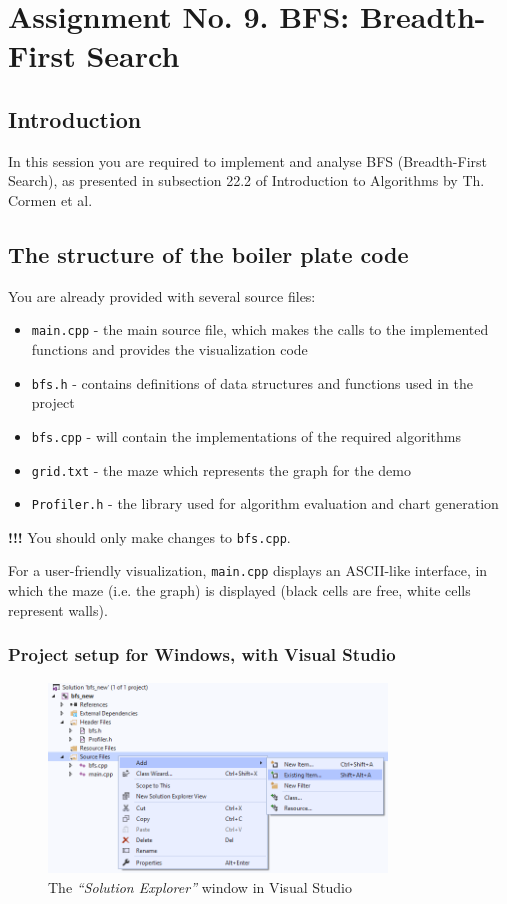 \documentclass[../en-fa-lab.tex]{subfiles}
\begin{document}
\section{\texorpdfstring{\textbf{Assignment No. 9. BFS: Breadth-First Search}}{Assignment No. 9. BFS: Breadth-First Search}}\label{assign9}




\subsection{Introduction}
In this session you are required to implement and analyse BFS (Breadth-First Search), as presented in subsection 22.2 of Introduction to Algorithms by Th. Cormen et al.

\subsection{The structure of the boiler plate code}
You are already provided with several source files:
\begin{itemize}
    \item \texttt{main.cpp} - the main source file, which makes the calls to the implemented functions and provides the visualization code
    \item \texttt{bfs.h} - contains definitions of data structures and functions used in the project
    \item \texttt{bfs.cpp} - will contain the implementations of the required algorithms
    \item \texttt{grid.txt} - the maze which represents the graph for the demo
    \item \texttt{Profiler.h} - the library used for algorithm evaluation and chart generation
\end{itemize}

\textbf{!!!} You should only make changes to \texttt{bfs.cpp}.

For a user-friendly visualization, \texttt{main.cpp} displays an ASCII-like interface, in which the maze (i.e. the graph) is displayed (black cells are free, white cells represent walls).

\subsubsection{Project setup for Windows, with Visual Studio}
\begin{figure}[h]
    \centering
    \includegraphics[width=9cm]{../Resources/lab9/vs_solution.png}
    \caption{The \textit{``Solution Explorer''} window in Visual Studio}
    \label{fig:vs}
\end{figure}
\end{document}
